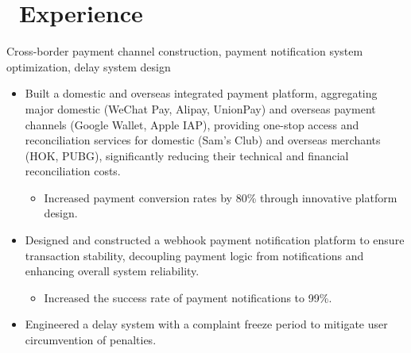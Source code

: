 \documentclass{resume}
\begin{document}
\section{\faUsers\ Experience}
\begin{onehalfspacing}
    Cross-border payment channel construction, payment notification system optimization, delay system design
\begin{itemize}
  \item Built a domestic and overseas integrated payment platform, aggregating major domestic (WeChat Pay, Alipay, UnionPay) and overseas payment channels (Google Wallet, Apple IAP), providing one-stop access and reconciliation services for domestic (Sam's Club) and overseas merchants (HOK, PUBG), significantly reducing their technical and financial reconciliation costs.
  \begin{itemize}
      \item Increased payment conversion rates by 80\% through innovative platform design.
  \end{itemize}
  \item Designed and constructed a webhook payment notification platform to ensure transaction stability, decoupling payment logic from notifications and enhancing overall system reliability.
  \begin{itemize}
      \item Increased the success rate of payment notifications to 99\%.
  \end{itemize}
  \item Engineered a delay system with a complaint freeze period to mitigate user circumvention of penalties.
\end{itemize}
\end{onehalfspacing}
\end{document}
